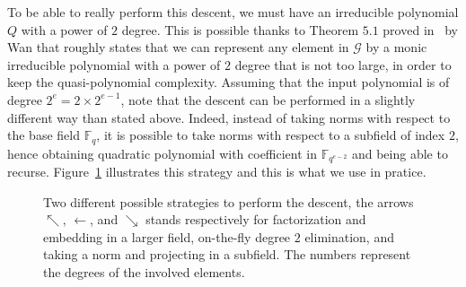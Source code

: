\documentclass[a4paper,11pt]{article}
\theoremstyle{break}
\theoremstyle{sc}
\theoremstyle{definition}
\theoremstyle{remark}
\begin{document}
To be able to really perform this descent, we must have an irreducible polynomial $Q$ with a 
power of $2$ degree. This is possible thanks to Theorem $5.1$ proved 
in~\cite{Wan97} by Wan that roughly states that we can represent any element in
$\mathcal G$ by a monic irreducible polynomial with a power of $2$ degree that is not too large,
in order to keep the quasi-polynomial complexity. Assuming that the input
polynomial is of degree $2^e = 2\times 2^{e-1}$, note that the descent can be performed
in a slightly different way than stated above. Indeed,
instead of taking norms with respect to the base field $\mathbb{F}_q$,
it is possible to take norms with respect to a subfield of index $2$, hence
obtaining quadratic polynomial with coefficient in $\mathbb{F}_{q^{e-2}}$ and
being able to recurse. Figure~\ref{fig:recurse} illustrates this strategy and
this is what we use in pratice.

\begin{figure}
  \caption{Two different possible strategies to perform the descent, the arrows
  $\nwarrow$, $\leftarrow$, and $\searrow$ stands respectively for
factorization and embedding in a larger field, on-the-fly degree $2$
elimination, and taking a norm and projecting in a subfield. The numbers
represent the degrees of the involved elements.}
  \label{fig:recurse}
\end{figure}
\end{document}
